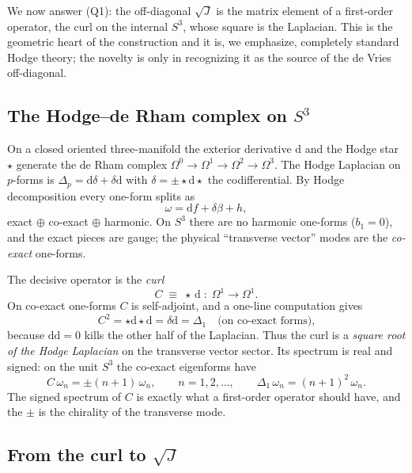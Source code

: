 \documentclass[11pt]{article}
\theoremstyle{plain}
\theoremstyle{definition}
\newcommand{\dd}{\mathrm{d}}
\begin{document}
We now answer (Q1): the off-diagonal $\sqrt J$ is the matrix element of a
first-order operator, the curl on the internal $S^3$, whose square is the
Laplacian. This is the geometric heart of the construction and it is, we
emphasize, completely standard Hodge theory; the novelty is only in
recognizing it as the source of the de Vries off-diagonal.

\subsection{The Hodge--de Rham complex on $S^3$}

On a closed oriented three-manifold the exterior derivative $\dd$ and the
Hodge star $\star$ generate the de Rham complex
$\Omega^0\to\Omega^1\to\Omega^2\to\Omega^3$. The Hodge Laplacian on
$p$-forms is $\Delta_p=\dd\delta+\delta\dd$ with $\delta=\pm\star\dd\star$
the codifferential. By Hodge decomposition every one-form splits as
\begin{equation}
\omega=\dd f+\delta\beta+h,
\end{equation}
exact $\oplus$ co-exact $\oplus$ harmonic. On $S^3$ there are no harmonic
one-forms ($b_1=0$), and the exact pieces are gauge; the physical
``transverse vector'' modes are the \emph{co-exact} one-forms.

The decisive operator is the \emph{curl}
\begin{equation}
C\;\equiv\;\star\,\dd\;:\;\Omega^1\to\Omega^1.
\end{equation}
On co-exact one-forms $C$ is self-adjoint, and a one-line computation gives
\begin{equation}
C^2=\star\dd\star\dd=\delta\dd=\Delta_1
\quad\text{(on co-exact forms),}
\label{eq:curlsquared}
\end{equation}
because $\dd\dd=0$ kills the other half of the Laplacian. Thus the curl is a
\emph{square root of the Hodge Laplacian} on the transverse vector sector.
Its spectrum is real and signed: on the unit $S^3$ the co-exact eigenforms
have
\begin{equation}
C\,\omega_n=\pm(n+1)\,\omega_n,\qquad n=1,2,\dots,
\qquad \Delta_1\,\omega_n=(n+1)^2\,\omega_n.
\end{equation}
The signed spectrum of $C$ is exactly what a first-order operator should
have, and the $\pm$ is the chirality of the transverse mode.

\subsection{From the curl to $\sqrt J$}
\end{document}
